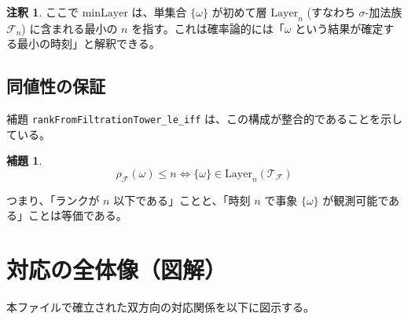 \documentclass[a4paper,11pt]{ltjsarticle}
\theoremstyle{definition}
\newtheorem{lemma}[definition]{補題}
\newtheorem{remark}[definition]{注釈}
\newcommand{\Filtration}{\mathcal{F}}
\newcommand{\Rank}{\rho}
\newcommand{\Tower}{\mathcal{T}}
\newcommand{\Layer}[1]{\mathrm{Layer}_{#1}}
\newcommand{\MinLayer}{\mathrm{minLayer}}
\begin{document}
\begin{remark}
ここで $\MinLayer$ は、単集合 $\{\omega\}$ が初めて層 $\Layer{n}$ (すなわち $\sigma$-加法族 $\Filtration_n$) に含まれる最小の $n$ を指す。これは確率論的には「$\omega$ という結果が確定する最小の時刻」と解釈できる。
\end{remark}

\subsection{同値性の保証}
補題 \texttt{rankFromFiltrationTower\_le\_iff} は、この構成が整合的であることを示している。
\begin{lemma}
\[
    \Rank_\Filtration(\omega) \le n \iff \{\omega\} \in \Layer{n}(\Tower_\Filtration)
\]
\end{lemma}
つまり、「ランクが $n$ 以下である」ことと、「時刻 $n$ で事象 $\{\omega\}$ が観測可能である」ことは等価である。

\section{対応の全体像（図解）}

本ファイルで確立された双方向の対応関係を以下に図示する。
\end{document}
